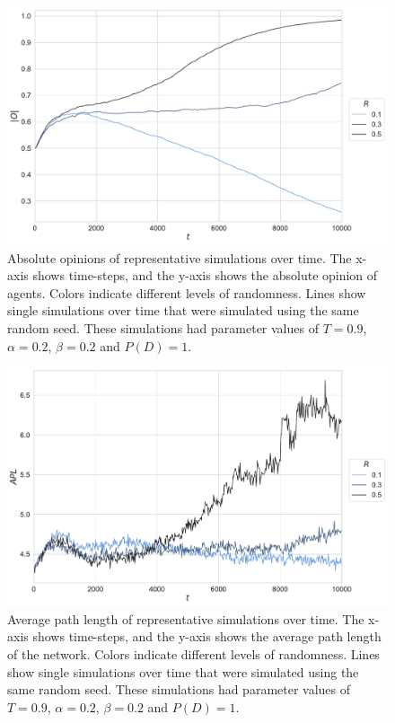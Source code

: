 \documentclass[11pt]{article}
\begin{document}
\begin{figure}[H]
    \centering
    \includegraphics[width=.7\linewidth]{../plots/example/Example_Absolute_Opinion.pdf}
  \caption{Absolute opinions of representative simulations over time. The x-axis shows time-steps, and the y-axis shows the absolute opinion of agents. Colors indicate different levels of randomness. Lines show single simulations over time that were simulated using the same random seed. These simulations had parameter values of $T = 0.9$, $\alpha = 0.2$, $\beta = 0.2$ and $P(D) = 1$.}
  \label{fig:example_abs_opinion}
\end{figure}

\begin{figure}[H]
    \centering
    \includegraphics[width=.7\linewidth]{../plots/example/Example_Average_Path_Length.pdf}
  \caption{Average path length of representative simulations over time. The x-axis shows time-steps, and the y-axis shows the average path length of the network. Colors indicate different levels of randomness. Lines show single simulations over time that were simulated using the same random seed. These simulations had parameter values of $T = 0.9$, $\alpha = 0.2$, $\beta = 0.2$ and $P(D) = 1$.}
  \label{fig:example_path}
\end{figure}
\end{document}
